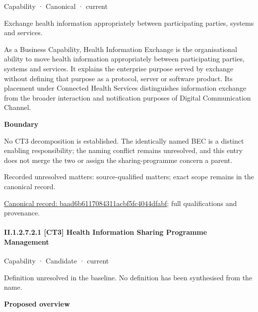 \label{element:baad6b6117084311acbf5fc4044dfabf}
{\small Capability · Canonical · current}\par

Exchange health information appropriately between participating parties, systems and services.



As a Business Capability, Health Information Exchange is the organisational ability to move health information appropriately between participating parties, systems and services. It explains the enterprise purpose served by exchange without defining that purpose as a protocol, server or software product. Its placement under Connected Health Services distinguishes information exchange from the broader interaction and notification purposes of Digital Communication Channel.



\textbf{Boundary}



No CT3 decomposition is established. The identically named BEC is a distinct enabling responsibility; the naming conflict remains unresolved, and this entry does not merge the two or assign the sharing-programme concern a parent.


{\small Recorded unresolved matters: source-qualified matters; exact scope remains in the canonical record.}\par
{\footnotesize \href{../../../../continuum/strategy/capability/baad6b6117084311acbf5fc4044dfabf.md}{Canonical record: baad6b6117084311acbf5fc4044dfabf}; full qualifications and provenance.}\par
\paragraph*{II.1.2.7.2.1 [CT3] Health Information Sharing Programme Management}
\label{navigation:II.1.2.7.2.1}

\label{element:6c5c2cb625414b149ac7f2ccb4b8a897}
{\small Capability · Candidate · current}\par

Definition unresolved in the baseline. No definition has been synthesised from the name.



\textbf{Proposed overview}




